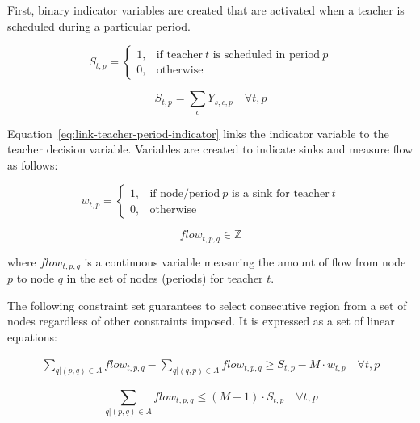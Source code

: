 \documentclass[12pt]{article}
\begin{document}
First, binary indicator variables are created that are activated when a teacher is scheduled during a particular period.

\begin{equation}
	S_{t,p} = 
	\begin{cases}
		1, & \text{if teacher}\ t \text{ is scheduled in period}\ p \\
		0, & \text{otherwise}
	\end{cases}
\end{equation}

\begin{equation} \label{eq:link-teacher-period-indicator}
	S_{t,p} = \displaystyle \sum_{c} Y_{s,c,p} \quad \forall t,p
\end{equation}

Equation~\ref{eq:link-teacher-period-indicator} links the indicator variable to the teacher decision variable. Variables are created to indicate sinks and measure flow as follows:

\begin{equation}
	w_{t,p} = 
	\begin{cases}
		1, & \text{if node/period}\ p \text{ is a sink for teacher}\ t \\
		0, & \text{otherwise} 
	\end{cases}
\end{equation}

\begin{equation}
	flow_{t,p,q} \in \mathbb{Z}
\end{equation}

where $flow_{t,p,q}$ is a continuous variable measuring the amount of flow from node $p$ to node $q$ in the set of nodes (periods) for teacher $t$.

The following constraint set guarantees to select consecutive region from a set of nodes regardless of other constraints imposed. It is expressed as a set of linear equations:

\begin{equation} \label{eq:net_flow}
\begin{split}
	\displaystyle\sum_{q|(p,q) \in A} flow_{t,p,q} - \displaystyle\sum_{q|(q,p) \in A} flow_{t,p,q} \geq
	 S_{t,p} - M \cdot w_{t,p}
	\quad \forall t,p
\end{split}
\end{equation}

\begin{equation} \label{eq:flow_out_of_subgraph}
	\displaystyle\sum_{q|(p,q) \in A} flow_{t,p,q} \leq (M-1) \cdot S_{t,p} \quad \forall t,p
\end{equation}
\end{document}
